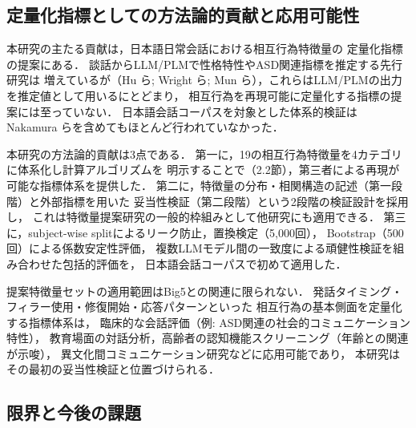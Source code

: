 \documentclass[dvipdfmx,11pt,a4paper]{bxjsarticle}
\renewcommand{\_}{\paperorigunderscore\allowbreak}%
\begin{document}
\subsection{定量化指標としての方法論的貢献と応用可能性}

本研究の主たる貢献は，日本語日常会話における相互行為特徴量の
定量化指標の提案にある．
談話からLLM/PLMで性格特性やASD関連指標を推定する先行研究は
増えているが（Hu ら\cite{hu2025}; Wright ら\cite{wright2026};
Mun ら\cite{mun2024}），これらはLLM/PLMの出力を推定値として用いるにとどまり，
相互行為を再現可能に定量化する指標の提案には至っていない．
日本語会話コーパスを対象とした体系的検証は
Nakamura ら\cite{nakamura2025}を含めてもほとんど行われていなかった．

本研究の方法論的貢献は3点である．
第一に，19の相互行為特徴量を4カテゴリに体系化し計算アルゴリズムを
明示することで（2.2節），第三者による再現が可能な指標体系を提供した．
第二に，特徴量の分布・相関構造の記述（第一段階）と外部指標を用いた
妥当性検証（第二段階）という2段階の検証設計を採用し，
これは特徴量提案研究の一般的枠組みとして他研究にも適用できる．
第三に，subject-wise splitによるリーク防止，置換検定（5,000回），
Bootstrap（500回）による係数安定性評価，
複数LLMモデル間の一致度による頑健性検証を組み合わせた包括的評価を，
日本語会話コーパスで初めて適用した．

提案特徴量セットの適用範囲はBig5との関連に限られない．
発話タイミング・フィラー使用・修復開始・応答パターンといった
相互行為の基本側面を定量化する指標体系は，
臨床的な会話評価（例: ASD関連の社会的コミュニケーション特性），
教育場面の対話分析，高齢者の認知機能スクリーニング（年齢との関連が示唆），
異文化間コミュニケーション研究などに応用可能であり，
本研究はその最初の妥当性検証と位置づけられる．

\subsection{限界と今後の課題}
\end{document}
